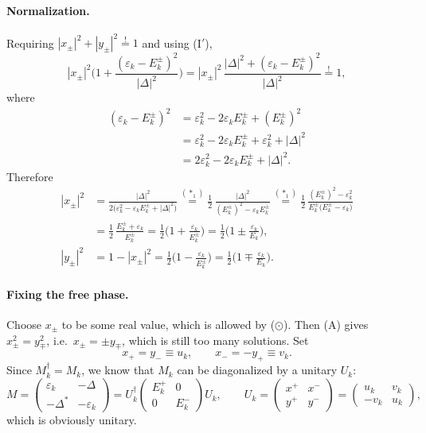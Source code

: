 \documentclass[../../main.tex]{subfiles}
\begin{document}
\paragraph{Normalization.}
Requiring $|x_\pm|^2+|y_\pm|^2\overset{!}{=}1$ and using (I$'$),
\begin{equation}
|x_\pm|^2\Big(1+\frac{(\varepsilon_k-E_k^\pm)^2}{|\Delta|^2}\Big)
=|x_\pm|^2\,\frac{|\Delta|^2+(\varepsilon_k-E_k^\pm)^2}{|\Delta|^2}\overset{!}{=}1,
\end{equation}
where
\begin{align}
(\varepsilon_k-E_k^\pm)^2
&=\varepsilon_k^2-2\varepsilon_k E_k^\pm+(E_k^\pm)^2\\
&=\varepsilon_k^2-2\varepsilon_k E_k^\pm+\varepsilon_k^2+|\Delta|^2\\
&=2\varepsilon_k^2-2\varepsilon_k E_k^\pm+|\Delta|^2 .
\end{align}
Therefore
\begin{align}
|x_\pm|^2
&=\frac{|\Delta|^2}{2\big(\varepsilon_k^2-\varepsilon_k E_k^\pm+|\Delta|^2\big)}
 \overset{(\ast_1)}{=}\frac{1}{2}\,
 \frac{|\Delta|^2}{(E_k^\pm)^2-\varepsilon_k E_k^\pm}
 \overset{(\ast_1)}{=}\frac{1}{2}\,
 \frac{(E_k^\pm)^2-\varepsilon_k^2}{E_k^\pm\big(E_k^\pm-\varepsilon_k\big)}\\
&=\frac{1}{2}\,\frac{E_k^\pm+\varepsilon_k}{E_k^\pm}
 =\frac{1}{2}\Big(1+\frac{\varepsilon_k}{E_k^\pm}\Big)
 =\frac{1}{2}\Big(1\pm\frac{\varepsilon_k}{E_k}\Big),\\
|y_\pm|^2&=1-|x_\pm|^2
 =\frac{1}{2}\Big(1-\frac{\varepsilon_k}{E_k^\pm}\Big)
 =\frac{1}{2}\Big(1\mp\frac{\varepsilon_k}{E_k}\Big).
\tag{A}
\end{align}

\paragraph{Fixing the free phase.}
Choose $x_\pm$ to be some real value, which is allowed by ($\odot$). Then (A) gives
$x_\pm^2=y_\mp^2$, i.e.\ $x_\pm=\pm y_\mp$, which is still too many solutions. Set
\begin{equation}
x_+=y_-\equiv u_k,\qquad x_-=-y_+\equiv v_k .
\end{equation}
Since $M^\dagger_k=M_k$, we know that $M_k$ can be diagonalized by a unitary $U_k$:
\begin{equation}
M=\begin{pmatrix}\varepsilon_k&-\Delta\\-\Delta^*&-\varepsilon_k\end{pmatrix}
=U^\dagger_k\begin{pmatrix}E_k^+&0\\0&E_k^-\end{pmatrix}U_k,
\qquad
U_k=\begin{pmatrix}x^+&x^-\\y^+&y^-\end{pmatrix}
=\begin{pmatrix}u_k&v_k\\-v_k&u_k\end{pmatrix},
\end{equation}
which is obviously unitary.
\end{document}
